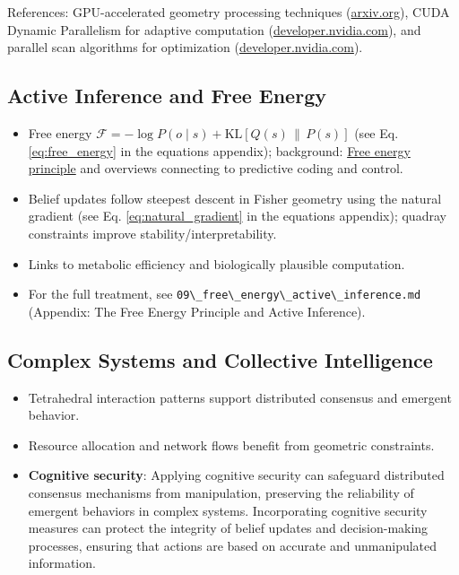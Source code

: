 \documentclass[
  10pt,
]{article}
\newcommand{\passthrough}[1]{#1}
\providecommand{\tightlist}{%
  \setlength{\itemsep}{0pt}\setlength{\parskip}{0pt}}
\begin{document}
References: GPU-accelerated geometry processing techniques
(\href{https://arxiv.org/abs/1501.04706?utm_source=openai}{arxiv.org}),
CUDA Dynamic Parallelism for adaptive computation
(\href{https://developer.nvidia.com/blog/introduction-cuda-dynamic-parallelism/?utm_source=openai}{developer.nvidia.com}),
and parallel scan algorithms for optimization
(\href{https://developer.nvidia.com/gpugems/gpugems3/part-vi-gpu-computing?utm_source=openai}{developer.nvidia.com}).

\subsection{Active Inference and Free
Energy}\label{active-inference-and-free-energy}

\begin{itemize}
\tightlist
\item
  Free energy
  \(\mathcal{F} = -\log P(o\mid s) + \mathrm{KL}[Q(s)\,\|\,P(s)]\) (see
  Eq. \eqref{eq:free_energy} in the equations appendix); background:
  \href{https://en.wikipedia.org/wiki/Free_energy_principle}{Free energy
  principle} and overviews connecting to predictive coding and control.
\item
  Belief updates follow steepest descent in Fisher geometry using the
  natural gradient (see Eq. \eqref{eq:natural_gradient} in the equations
  appendix); quadray constraints improve stability/interpretability.
\item
  Links to metabolic efficiency and biologically plausible computation.
\item
  For the full treatment, see
  \passthrough{\lstinline!09\_free\_energy\_active\_inference.md!}
  (Appendix: The Free Energy Principle and Active Inference).
\end{itemize}

\subsection{Complex Systems and Collective
Intelligence}\label{complex-systems-and-collective-intelligence}

\begin{itemize}
\tightlist
\item
  Tetrahedral interaction patterns support distributed consensus and
  emergent behavior.
\item
  Resource allocation and network flows benefit from geometric
  constraints.
\item
  \textbf{Cognitive security}: Applying cognitive security can safeguard
  distributed consensus mechanisms from manipulation, preserving the
  reliability of emergent behaviors in complex systems. Incorporating
  cognitive security measures can protect the integrity of belief
  updates and decision-making processes, ensuring that actions are based
  on accurate and unmanipulated information.
\end{itemize}
\end{document}
